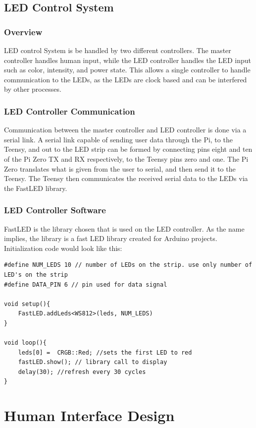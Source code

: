 		\subsection{LED Control System}
			\subsubsection{Overview}
				\noindent LED control System is be handled by two different controllers. The master controller handles human input, while the LED controller handles the LED input such as color, intensity, and power state.
				This allows a single controller to handle communication to the LEDs, as the
				LEDs are clock based and can be interfered by other processes. \cite{fastLED}
				\subsubsection{LED Controller Communication}
				\noindent Communication between the master controller and LED controller is done via a serial link.
				A serial link capable of sending user data through the Pi, to the Teensy, and out to the LED strip can be formed by connecting pins eight and ten of the Pi Zero TX and RX respectively, to the Teensy pins zero and one.
				The Pi Zero translates what is given from the user to serial, and then send it to the Teensy. The Teensy then communicates the received serial data to the LEDs via the FastLED library.
				\subsubsection{LED Controller Software}
				\noindent FastLED is the library chosen that is used on the LED controller.
				As the name implies, the library is a fast LED library created for Arduino projects.
				Initialization code would look like this:

			\begin{lstlisting}
#define NUM_LEDS 10 // number of LEDs on the strip. use only number of LED's on the strip
#define DATA_PIN 6 // pin used for data signal

void setup(){
	FastLED.addLeds<WS812>(leds, NUM_LEDS)
}

void loop(){
	leds[0] =  CRGB::Red; //sets the first LED to red
	fastLED.show(); // library call to display
	delay(30); //refresh every 30 cycles
}

		\end{lstlisting}

			\section{Human Interface Design}
